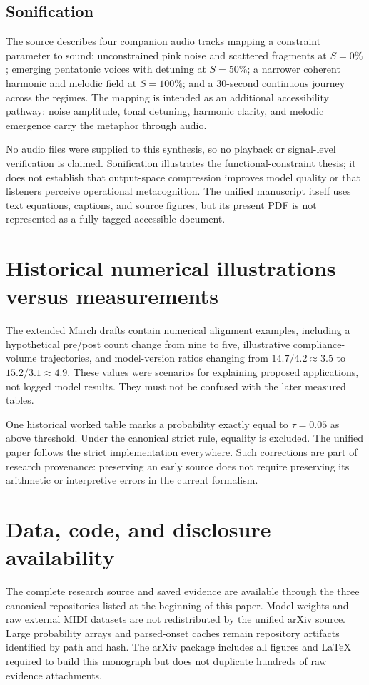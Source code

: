 \subsection{Sonification}
The source describes four companion audio tracks mapping a constraint parameter to sound: unconstrained pink noise and scattered fragments at $S=0\%$; emerging pentatonic voices with detuning at $S=50\%$; a narrower coherent harmonic and melodic field at $S=100\%$; and a 30-second continuous journey across the regimes. The mapping is intended as an additional accessibility pathway: noise amplitude, tonal detuning, harmonic clarity, and melodic emergence carry the metaphor through audio.

No audio files were supplied to this synthesis, so no playback or signal-level verification is claimed. Sonification illustrates the functional-constraint thesis; it does not establish that output-space compression improves model quality or that listeners perceive operational metacognition. The unified manuscript itself uses text equations, captions, and source figures, but its present PDF is not represented as a fully tagged accessible document.

\section{Historical numerical illustrations versus measurements}
The extended March drafts contain numerical alignment examples, including a hypothetical pre/post count change from nine to five, illustrative compliance-volume trajectories, and model-version ratios changing from $14.7/4.2\approx3.5$ to $15.2/3.1\approx4.9$. These values were scenarios for explaining proposed applications, not logged model results. They must not be confused with the later measured tables.

One historical worked table marks a probability exactly equal to $\tau=0.05$ as above threshold. Under the canonical strict rule, equality is excluded. The unified paper follows the strict implementation everywhere. Such corrections are part of research provenance: preserving an early source does not require preserving its arithmetic or interpretive errors in the current formalism.

\section{Data, code, and disclosure availability}
The complete research source and saved evidence are available through the three canonical repositories listed at the beginning of this paper. Model weights and raw external MIDI datasets are not redistributed by the unified arXiv source. Large probability arrays and parsed-onset caches remain repository artifacts identified by path and hash. The arXiv package includes all figures and LaTeX required to build this monograph but does not duplicate hundreds of raw evidence attachments.

